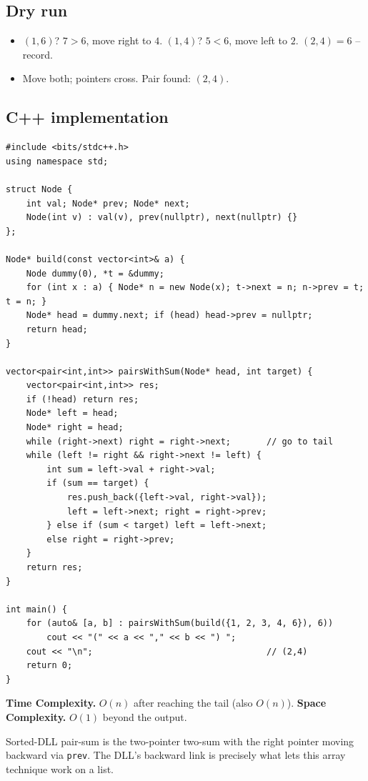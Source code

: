 \subsection*{Dry run}


\begin{itemize}
  \item $(1,6)$? $7>6$, move right to $4$. $(1,4)$? $5<6$, move left to
        $2$. $(2,4)=6$ -- record.
  \item Move both; pointers cross. Pair found: $(2,4)$.
\end{itemize}

\subsection*{C++ implementation}

\begin{lstlisting}
#include <bits/stdc++.h>
using namespace std;

struct Node {
    int val; Node* prev; Node* next;
    Node(int v) : val(v), prev(nullptr), next(nullptr) {}
};

Node* build(const vector<int>& a) {
    Node dummy(0), *t = &dummy;
    for (int x : a) { Node* n = new Node(x); t->next = n; n->prev = t; t = n; }
    Node* head = dummy.next; if (head) head->prev = nullptr;
    return head;
}

vector<pair<int,int>> pairsWithSum(Node* head, int target) {
    vector<pair<int,int>> res;
    if (!head) return res;
    Node* left = head;
    Node* right = head;
    while (right->next) right = right->next;       // go to tail
    while (left != right && right->next != left) {
        int sum = left->val + right->val;
        if (sum == target) {
            res.push_back({left->val, right->val});
            left = left->next; right = right->prev;
        } else if (sum < target) left = left->next;
        else right = right->prev;
    }
    return res;
}

int main() {
    for (auto& [a, b] : pairsWithSum(build({1, 2, 3, 4, 6}), 6))
        cout << "(" << a << "," << b << ") ";
    cout << "\n";                                  // (2,4)
    return 0;
}
\end{lstlisting}

\begin{complexitybox}
\textbf{Time Complexity.} $O(n)$ after reaching the tail (also $O(n)$).
\textbf{Space Complexity.} $O(1)$ beyond the output.
\end{complexitybox}

\begin{takeawaybox}
Sorted-DLL pair-sum is the two-pointer two-sum with the right pointer moving
backward via \texttt{prev}. The DLL's backward link is precisely what lets
this array technique work on a list.
\end{takeawaybox}
